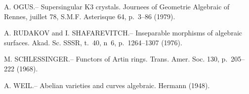 \documentclass[12pt,a4paper]{article}
\theoremstyle{plain}
\theoremstyle{definition}
\theoremstyle{remark}
\begin{document}
\begin{enumerate}[label={[\arabic*]}, leftmargin=2em, itemsep=0.3em]
\item[$\text{[13]}$] A. OGUS.-- Supersingular K3 crystals. Journees of Geometrie Algebraic of Rennes, juillet 78, S.M.F. Asterisque 64, p.~3--86 (1979).

\item[$\text{[14]}$] A. RUDAKOV and I. SHAFAREVITCH.-- Inseparable morphisms of algebraic surfaces. Akad. Sc. SSSR, t.~40, n~6, p.~1264--1307 (1976).

\item[$\text{[15]}$] M. SCHLESSINGER.-- Functors of Artin rings. Trans. Amer. Soc. 130, p.~205--222 (1968).

\item[$\text{[16]}$] A. WEIL.-- Abelian varieties and curves algebraic. Hermann (1948).
\end{enumerate}
\end{document}
